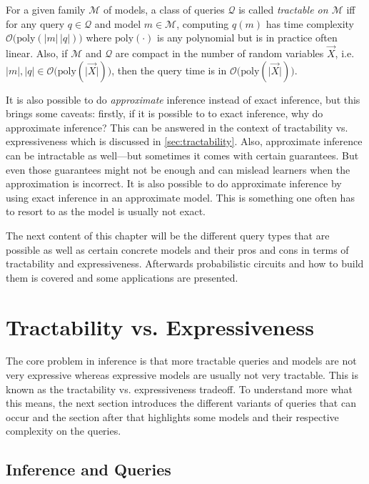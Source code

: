 	For a given family \(\mathcal{M}\) of models, a class of queries \(\mathcal{Q}\) is called \emph{tractable on \(\mathcal{M}\)} iff for any query \( q \in \mathcal{Q} \) and model \( m \in \mathcal{M} \), computing \( q(m) \) has time complexity \( \mathcal{O}\big( \mathrm{poly}(\lvert m \rvert \, \lvert q \rvert) \big) \) where \( \mathrm{poly}(\cdot) \) is any polynomial but is in practice often linear. Also, if \(\mathcal{M}\) and \(\mathcal{Q}\) are compact in the number of random variables \(\vec{X}\), i.e. \( \lvert m \rvert, \lvert q \rvert \in \mathcal{O}\big( \mathrm{poly}(\lvert \vec{X} \rvert) \big) \), then the query time is in \( \mathcal{O}\big( \mathrm{poly}(\lvert \vec{X} \rvert) \big) \).

	It is also possible to do \emph{approximate} inference instead of exact inference, but this brings some caveats: firstly, if it is possible to to exact inference, why do approximate inference? This can be answered in the context of tractability vs. expressiveness which is discussed in \autoref{sec:tractability}. Also, approximate inference can be intractable as well---but sometimes it comes with certain guarantees. But even those guarantees might not be enough and can mislead learners when the approximation is incorrect. It is also possible to do approximate inference by using exact inference in an approximate model. This is something one often has to resort to as the model is usually not exact.

	The next content of this chapter will be the different query types that are possible as well as certain concrete models and their pros and cons in terms of tractability and expressiveness. Afterwards probabilistic circuits and how to build them is covered and some applications are presented.

	\section{Tractability vs. Expressiveness}
		\label{sec:tractability}

		The core problem in inference is that more tractable queries and models are not very expressive whereas expressive models are usually not very tractable. This is known as the tractability vs. expressiveness tradeoff. To understand more what this means, the next section introduces the different variants of queries that can occur and the section after that highlights some models and their respective complexity on the queries.

		\subsection{Inference and Queries}
			\label{subsec:queries}

